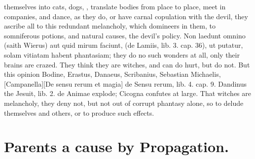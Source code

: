 {{themselves into cats, dogs, \etc{}, translate bodies from place to place,
meet in companies, and dance, as they do, or have carnal copulation
with the devil, they ascribe all to this redundant melancholy, which
domineers in them, to  somniferous potions, and natural causes,
the devil's policy. Non laedunt omnino (saith Wierus) aut quid mirum
faciunt, (de Lamiis, lib. 3. cap. 36), ut putatur, solam vitiatam
habent phantasiam; they do no such wonders at all, only their
brains are crazed. They think they are witches, and can do
hurt, but do not. But this opinion Bodine, Erastus, Danaeus,
Scribanius, Sebastian Michaelis, [Campanella][\textlatin{De sensu rerum et magia}] \textlatin{de Sensu rerum}, lib. 4.
cap. 9. Dandinus the Jesuit, lib. 2. de Animae explode;
Cicogna confutes at large. That witches are melancholy, they deny
not, but not out of corrupt phantasy alone, so to delude themselves and
others, or to produce such effects.

\section{Parents a cause by Propagation.}

}}

